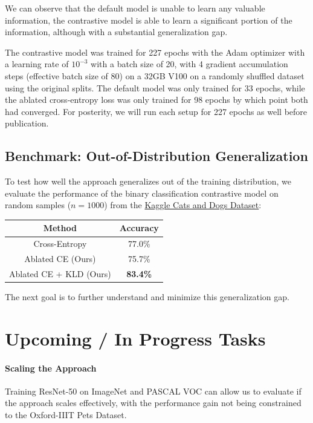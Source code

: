\documentclass{article}
\theoremstyle{plain}
\theoremstyle{definition}
\theoremstyle{remark}
\begin{document}
We can observe that the default model is unable to learn any valuable information, the contrastive model is able to learn a significant portion of the information, although with a substantial generalization gap.

The contrastive model was trained for 227 epochs with the Adam optimizer with a learning rate of $10^{-3}$ with a batch size of 20, with 4 gradient accumulation steps (effective batch size of 80) on a 32GB V100 on a randomly shuffled dataset using the original splits. The default model was only trained for 33 epochs, while the ablated cross-entropy loss was only trained for 98 epochs by which point both had converged. For posterity, we will run each setup for 227 epochs as well before publication.

\subsection{Benchmark: Out-of-Distribution Generalization}

To test how well the approach generalizes out of the training distribution, we evaluate the performance of the binary classification contrastive model on random samples ($n=1000$) from the \href{https://www.microsoft.com/en-us/download/details.aspx?id=54765}{Kaggle Cats and Dogs Dataset}:
\begin{table}[h]
	\centering
	\begin{tabular}{c|c}
		\toprule
		\textbf{Method} & \textbf{Accuracy} \\
		\midrule
		Cross-Entropy & 77.0\% \\
		Ablated CE (Ours) & 75.7\% \\
		Ablated CE + KLD (Ours) & \bf 83.4\% \\
		\bottomrule
	\end{tabular}
\end{table}

The next goal is to further understand and minimize this generalization gap.

\section{Upcoming / In Progress Tasks} 

\paragraph{Scaling the Approach} Training ResNet-50 on ImageNet and PASCAL VOC can allow us to evaluate if the approach scales effectively, with the performance gain not being constrained to the Oxford-IIIT Pets Dataset.
\end{document}
